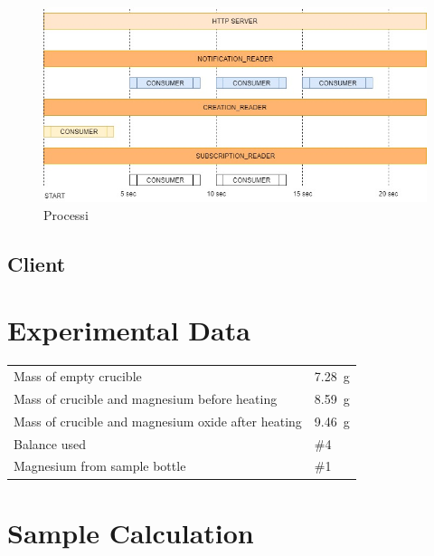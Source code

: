\documentclass{article}
\begin{document}
\begin{figure}[h]
\begin{center}
\centering
\includegraphics[width=1.1\textwidth]{stableprocess.jpg} %
\caption{Processi}
\label{fig:Processi}
\end{center}
\end{figure}

\subsection{Client}
 

\section{Experimental Data}

\begin{tabular}{ll}
Mass of empty crucible & \SI{7.28}{\gram}\\
Mass of crucible and magnesium before heating & \SI{8.59}{\gram}\\
Mass of crucible and magnesium oxide after heating & \SI{9.46}{\gram}\\
Balance used & \#4\\
Magnesium from sample bottle & \#1
\end{tabular}


\section{Sample Calculation}
\end{document}
